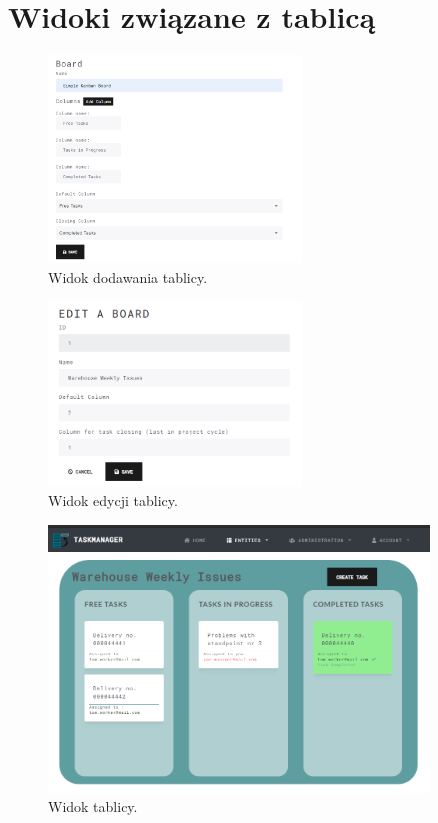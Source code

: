 \section{Widoki związane z tablicą}
\begin{figure}[h!]
	\centering
	\includegraphics[width=0.60\textwidth]{addboard}
	
	\caption{Widok dodawania tablicy.}
	\label{addb}
\end{figure}


\begin{figure}[h!]
	\centering
	\includegraphics[width=0.60\textwidth]{boardedit}
	
	\caption{Widok edycji tablicy.}
	\label{boardedit}
\end{figure}

\begin{figure}[h!]
	\centering
	\includegraphics[width=0.90\textwidth]{kanban-view}
	
	\caption{Widok tablicy.}
	\label{board}
\end{figure}
\clearpage

